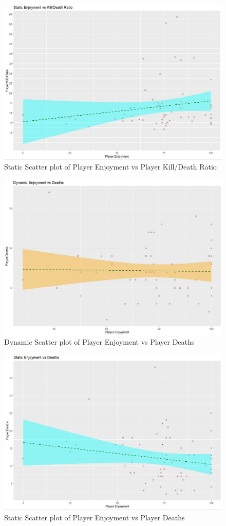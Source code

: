 \documentclass[journal]{IEEEtran}
\begin{document}
\begin{figure}[h]
	\includegraphics[width=0.75\linewidth]{staticfunKDR.jpg}
	\caption{Static Scatter plot of Player Enjoyment vs Player Kill/Death Ratio}
	\label{Analysis Test}
\end{figure} 

\begin{figure}[h]
	\includegraphics[width=0.75\linewidth]{dynamicfundeath.jpg}
	\caption{Dynamic Scatter plot of Player Enjoyment vs Player Deaths}
	\label{Analysis Test}
\end{figure} 

\begin{figure}[h]
	\includegraphics[width=0.75\linewidth]{staticfundeath.jpg}
	\caption{Static Scatter plot of Player Enjoyment vs Player Deaths}
	\label{Analysis Test}
\end{figure}
\end{document}

